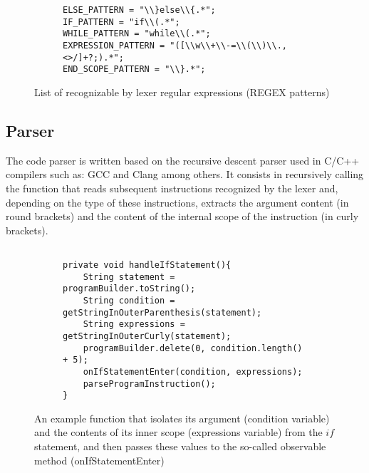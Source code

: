 		\break
		
				
\begin{figure}[H]
  \begin{subfigure}{\textwidth}
			\begin{verbatim}
ELSE_PATTERN = "\\}else\\{.*";
IF_PATTERN = "if\\(.*";
WHILE_PATTERN = "while\\(.*";
EXPRESSION_PATTERN = "([\\w\\+\\-=\\(\\)\\.,<>/]+?;).*";
END_SCOPE_PATTERN = "\\}.*";
			\end{verbatim}
  \end{subfigure}\hfill
  \caption{List of recognizable by lexer regular expressions (REGEX patterns)}
\end{figure}
			
	\subsection{Parser} 		
  The code parser is written based on the recursive descent parser used in C/C++ compilers such as: GCC and Clang among others. It consists in recursively calling the function that reads subsequent instructions recognized by the lexer and, depending on the type of these instructions, extracts the argument content (in round brackets) and the content of the internal scope of the instruction (in curly brackets).
						
\begin{figure}[H]
  \begin{subfigure}{\textwidth}
			\begin{verbatim}

private void handleIfStatement(){
    String statement = programBuilder.toString();
    String condition = getStringInOuterParenthesis(statement);
    String expressions = getStringInOuterCurly(statement);
    programBuilder.delete(0, condition.length() + 5);
    onIfStatementEnter(condition, expressions);
    parseProgramInstruction();
}
			\end{verbatim}
  \end{subfigure}\hfill
  \caption{An example function that isolates its argument (condition variable) and the contents of its inner scope (expressions variable) from the $if$ statement, and then passes these values to the so-called observable method (onIfStatementEnter)}
\end{figure}
		
